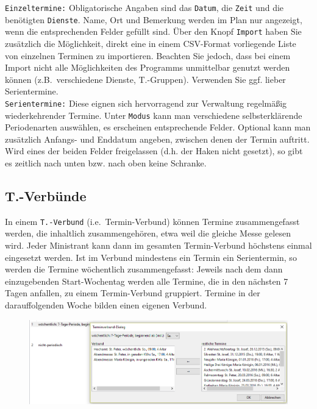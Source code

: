 \documentclass[a4paper,11pt]{article}
\begin{document}
\texttt{Einzeltermine:} Obligatorische Angaben sind das \texttt{Datum}, die \texttt{Zeit} und die benötigten \texttt{Dienste}. Name, Ort und Bemerkung werden im Plan nur angezeigt, wenn die entsprechenden Felder gefüllt sind. Über den Knopf \texttt{Import} haben Sie zusätzlich die Möglichkeit, direkt eine in einem CSV-Format vorliegende Liste von einzelnen Terminen zu importieren. Beachten Sie jedoch, dass bei einem Import nicht alle Möglichkeiten des Programms unmittelbar genutzt werden können (z.B.\, verschiedene Dienste, T.-Gruppen). Verwenden Sie ggf. lieber Serientermine.\\
\texttt{Serientermine:} Diese eignen sich hervorragend zur Verwaltung regelmäßig wiederkehrender Termine. Unter \texttt{Modus} kann man verschiedene selbsterklärende Periodenarten auswählen, es erscheinen entsprechende Felder. Optional kann man zusätzlich Anfangs- und Enddatum angeben, zwischen denen der Termin auftritt. Wird eines der beiden Felder freigelassen (d.h. der Haken nicht gesetzt), so gibt es zeitlich nach unten bzw. nach oben keine Schranke.
\subsection{T.-Verbünde}
In einem \texttt{T.-Verbund} (i.e.\ Termin-Verbund) können Termine zusammengefasst werden, die inhaltlich zusammengehören, etwa weil die gleiche Messe gelesen wird. Jeder Ministrant kann dann im gesamten Termin-Verbund höchstens einmal eingesetzt werden. Ist im Verbund mindestens ein Termin ein Serientermin, so werden die Termine wöchentlich zusammengefasst: Jeweils nach dem dann einzugebenden Start-Wochentag werden alle Termine, die in den nächsten 7 Tagen anfallen, zu einem Termin-Verbund gruppiert. Termine in der darauffolgenden Woche bilden einen eigenen Verbund.
\begin{figure}[ht]
\includegraphics[scale=0.6]{tgruppe2.PNG}
\end{figure}
\end{document}
